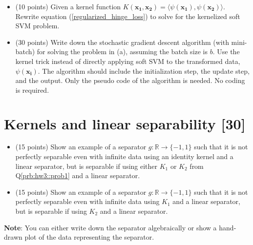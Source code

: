 \begin{itemize}[(a)]
    \item (10 points) Given a kernel function $K(\bm{x_1},\bm{x_2}) = \langle \psi(\bm{x_1}),\psi(\bm{x_2})\rangle$. Rewrite equation (\ref{regularized_hinge_loss}) to solve for the kernelized soft SVM problem.
\end{itemize}  
\begin{itemize}[(b)]
    \item (30 points) Write down the stochastic gradient descent algorithm (with mini-batch) for solving the problem in (a), assuming the batch size is $b$. Use the kernel trick instead of directly applying soft SVM to the transformed data, $\psi(\bm{x_i})$. The algorithm should include the initialization step, the update step, and the output. Only the pseudo code of the algorithm is needed. No coding is required.
\end{itemize}  
\label{prb:hw3::prob2}



\newpage
\section{Kernels and linear separability [30]}
\label{prb:hw3::prob3}
\begin{itemize}[(a)]
    \item (15 points) Show an example of a separator $g: \mathbb{R} \rightarrow \{-1,1\}$ such that it is not perfectly separable even with infinite data using an identity kernel and a linear separator, but is separable if using either $K_1$ or $K_2$ from Q\ref{prb:hw3::prob1} and a linear separator.
\end{itemize} 

\begin{itemize}[(b)]
    \item (15 points) Show an example of a separator $g: \mathbb{R} \rightarrow \{-1,1\}$ such that it is not perfectly separable even with infinite data using $K_1$ and a linear separator, but is separable if using $K_2$ and a linear separator. 
\end{itemize} 

\noindent \textbf{Note}: You can either write down the separator algebraically or show a hand-drawn plot of the data representing the separator.
